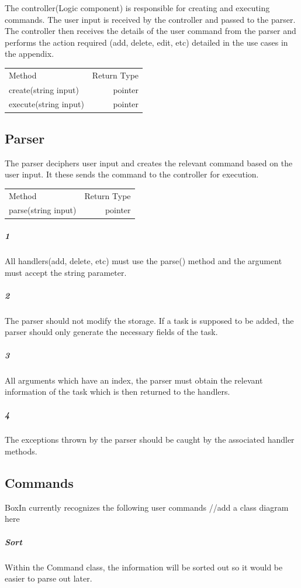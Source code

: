 \documentclass[12pt]{extarticle}
\begin{document}
The controller(Logic component) is responsible for creating and executing commands. The user input is received by the controller and passed to the parser. The controller then receives the details of the user command from the parser and performs the action required (add, delete, edit, etc) detailed in the use cases in the appendix.

\begin{center}
\begin{tabular}{|l|r|}
Method                & Return Type \\
create(string input)  & pointer     \\
execute(string input) & pointer    
\end{tabular}
\end{center}

\subsection{Parser}

The parser deciphers user input and creates the relevant command based on the user input. It these sends the command to the controller for execution.

\begin{center}
\begin{tabular}{|l|r|}
Method              & Return Type \\
parse(string input) & pointer    
\end{tabular}
\end{center}

\subparagraph{1} All handlers(add, delete, etc) must use the parse() method and the argument must accept the string parameter.

\subparagraph{2} The parser should not modify the storage. If a task is supposed to be added, the parser should only generate the necessary fields of the task.

\subparagraph{3} All arguments which have an index, the parser must obtain the relevant information of the task which is then returned to the handlers.

\subparagraph{4} The exceptions thrown by the parser should be caught by the associated handler methods.

\subsection{Commands}
BoxIn currently recognizes the following user commands
//add a class diagram here 
\subparagraph{Sort}
Within the Command class, the information will be sorted out so it would be easier to parse out later.
\end{document}
